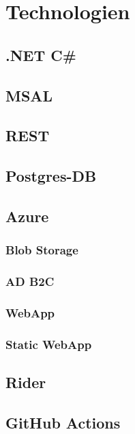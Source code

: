 
\section{Technologien}

\subsection{.NET C\#}

\subsection{MSAL}

\subsection{REST}

\subsection{Postgres-DB}

\subsection{Azure}

\subsubsection{Blob Storage}

\subsubsection{AD B2C}

\subsubsection{WebApp}

\subsubsection{Static WebApp}

\subsection{Rider}

\subsection{GitHub Actions}


